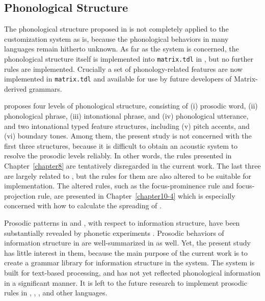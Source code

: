\subsection{Phonological Structure}
\label{9:ssec:phonology}


The phonological structure proposed in \citet{bildhauer:07} is not
completely applied to the customization system as is, because the
phonological behaviors in many languages remain hitherto unknown.  As
far as the \lingo {} system is concerned, the
phonological structure itself is implemented into \texttt{matrix.tdl}
in , but no further rules are implemented.  Crucially a set
of phonology-related features are now implemented in
\texttt{matrix.tdl} and available for use by future developers of
Matrix-derived grammars.


\citet{bildhauer:07} proposes four levels of phonological structure,
consisting of (i) prosodic word, (ii) phonological phrase, (iii)
intonational phrase, and (iv) phonological utterance, and two
intonational typed feature structures, including (v) pitch accents,
and (vi) boundary tones. Among them, the present study is not
concerned with the first three structures, because it is difficult to
obtain an acoustic system to resolve the prosodic levels reliably.  In
other words, the rules presented in Chapter~\ref{chapter8}
 are tentatively disregarded in the
current work. The last three are largely related to , but the rules for them are also altered to be suitable
for implementation. The altered rules, such as the focus-prominence
rule and focus-projection rule, are presented in
Chapter~\ref{chapter10-4} which is especially concerned with how to
calculate the spreading of .


Prosodic patterns in  and , with respect to
information structure, have been substantially revealed by phonetic
experiments \citep{jun:etal:07,ueyama:jun:98,jun:lee:98}. Prosodic
behaviors of information structure in  are
well-summarized in \citet{bildhauer:07} as well. Yet, the present
study has little interest in them, because the main purpose of the
current work is to create a grammar library for information structure
in the \lingo {} system. The system is built for
text-based processing, and has not yet reflected phonological
information in a significant manner. It is left to the future research
to implement prosodic rules in , ,
, and other languages.






